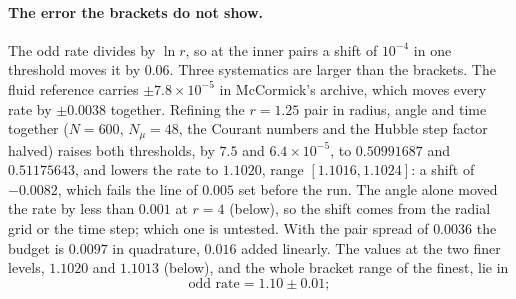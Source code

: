 \documentclass[11pt]{article}
\begin{document}
\paragraph{The error the brackets do not show.} The odd rate divides by $\ln r$, so at the inner pairs a shift of $10^{-4}$ in one threshold moves it by $0.06$. Three systematics are larger than the brackets. The fluid reference carries $\pm7.8\times10^{-5}$ in McCormick's archive, which moves every rate by $\pm0.0038$ together. Refining the $r=1.25$ pair in radius, angle and time together ($N=600$, $N_\mu=48$, the Courant numbers and the Hubble step factor halved) raises both thresholds, by $7.5$ and $6.4\times10^{-5}$, to $0.50991687$ and $0.51175643$, and lowers the rate to $1.1020$, range $[1.1016,1.1024]$: a shift of $-0.0082$, which fails the line of $0.005$ set before the run. The angle alone moved the rate by less than $0.001$ at $r=4$ (below), so the shift comes from the radial grid or the time step; which one is untested. With the pair spread of $0.0036$ the budget is $0.0097$ in quadrature, $0.016$ added linearly. The values at the two finer levels, $1.1020$ and $1.1013$ (below), and the whole bracket range of the finest, lie in
\begin{equation}
\text{odd rate}=1.10\pm0.01;
\end{equation}
\end{document}
